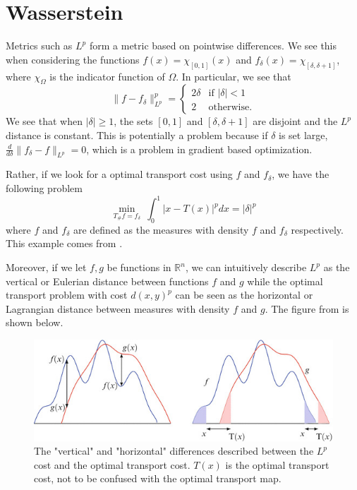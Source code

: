 \documentclass[12pt]{article}
\newcommand{\R}{\mathbb{R}}
\theoremstyle{plain}
\numberwithin{equation}{section}
\begin{document}
\newpage
\section{Wasserstein}

Metrics such as $L^p$ form a metric based on pointwise differences. We see this when considering the functions $f(x)=\chi_{[0,1]}(x)$ and $f_\delta(x) = \chi_{[\delta,\delta+1]}$, where $\chi_\Omega$ is the indicator function of $\Omega$.
In particular, we see that 
\[\|f-f_\delta\|_{L^p}^p = \begin{cases} 2\delta &\text{if $|\delta| < 1$} \\
2 &\text{otherwise.}\end{cases}\]
We see that when $|\delta| \ge 1$, the sets $[0,1]$ and $[\delta,\delta+1]$ are disjoint and the $L^p$ distance is constant. This is potentially a problem because if $\delta$ is set large, $\frac{d}{d\delta}\|f_\delta - f \|_{L^p} = 0$, which is a problem in gradient based optimization.

Rather, if we look for a optimal transport cost using $f$ and $f_\delta$, we have the following problem 
\[\min_{T_\#f = f_\delta}\ \int_0^1|x-T(x)|^pdx = |\delta|^p\]
where $f$ and $f_\delta$ are defined as the measures with density $f$ and $f_\delta$ respectively. This example comes from \cite{thorpe}.

Moreover, if we let $f,g$ be functions in $\R^n$, we can intuitively describe $L^p$ as the vertical or Eulerian distance between functions $f$ and $g$ while the optimal transport problem with cost $d(x,y)^p$ can be seen as the horizontal or Lagrangian distance between measures with density $f$ and $g$. The figure from \cite{santambrogio} is shown below.
\begin{figure}[H]
  \center
  \includegraphics[scale=0.6]{wasserstein_lp.jpg}
  \caption{The "vertical" and "horizontal" differences described between the $L^p$ cost and the optimal transport cost. $T(x)$ is the optimal transport cost, not to be confused with the optimal transport map.}
\end{figure}
\end{document}
